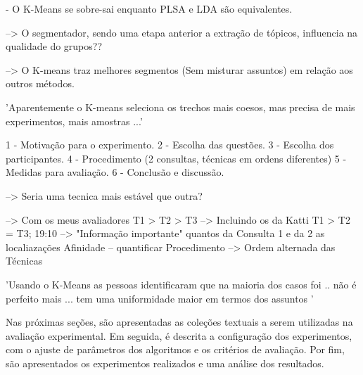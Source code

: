 


 - O K-Means se sobre-sai enquanto PLSA e LDA são equivalentes.


--> O segmentador, sendo uma etapa anterior a extração de tópicos, influencia na qualidade do grupos??

--> O K-means traz melhores segmentos (Sem misturar assuntos) em relação aos outros métodos.


'Aparentemente o K-means seleciona os trechos mais coesos, mas precisa de mais experimentos, mais amostras ...'




 1 - Motivação para o experimento.
 2 - Escolha das questões.
 3 - Escolha dos participantes.
 4 - Procedimento (2 consultas, técnicas em ordens diferentes)
 5 - Medidas para avaliação.
 6 - Conclusão e discussão.



--> Seria uma tecnica mais estável que  outra? 


--> Com os meus avaliadores T1 > T2 > T3
--> Incluindo os da Katti   T1 > T2 = T3;
19:10 --> "Informação importante"
quantos da Consulta 1 e da 2
as localiazações
Afinidade -- quantificar
Procedimento --> Ordem alternada das Técnicas






'Usando o K-Means as pessoas identificaram que na maioria dos casos foi .. não é perfeito mais ... tem uma uniformidade maior em termos dos assuntos '













Nas próximas seções, são apresentadas as coleções textuais a serem utilizadas na avaliação experimental. Em seguida, é descrita a configuração dos experimentos, com o ajuste de parâmetros dos algoritmos e os critérios de avaliação. Por fim, são apresentados os experimentos realizados e uma análise dos resultados.





